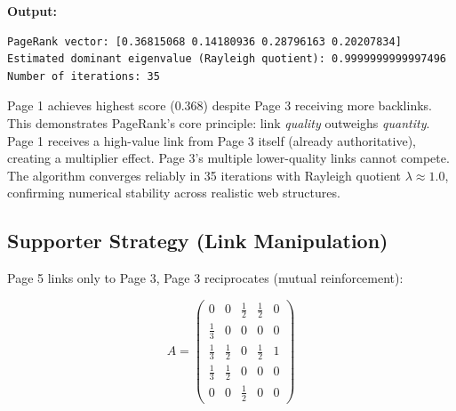 \documentclass[11pt]{article}
\begin{document}
\noindent\textbf{Output:}
\begin{lstlisting}
PageRank vector: [0.36815068 0.14180936 0.28796163 0.20207834]
Estimated dominant eigenvalue (Rayleigh quotient): 0.9999999999997496
Number of iterations: 35
\end{lstlisting}
\noindent



\noindent Page 1 achieves highest score (0.368) despite Page 3 receiving more backlinks. This demonstrates PageRank's core principle: link \emph{quality} outweighs \emph{quantity}. Page 1 receives a high-value link from Page 3 itself (already authoritative), creating a multiplier effect. Page 3's multiple lower-quality links cannot compete. The algorithm converges reliably in 35 iterations with Rayleigh quotient $\lambda \approx 1.0$, confirming numerical stability across realistic web structures.

\subsection{Supporter Strategy (Link Manipulation)}

Page 5 links only to Page 3, Page 3 reciprocates (mutual reinforcement):



\begin{figure}[h!]
\centering
\begin{minipage}{0.45\textwidth}
\centering
{}
\end{minipage}
\hfill
\begin{minipage}{0.45\textwidth}
\centering
\[
A =
\begin{pmatrix}
0 & 0 & \tfrac12 & \tfrac12 & 0 \\
\tfrac13 & 0 & 0 & 0 & 0 \\
\tfrac13 & \tfrac12 & 0 & \tfrac12 & 1\\
\tfrac13 & \tfrac12 & 0 & 0 & 0 \\
0 & 0 & \tfrac12 & 0 & 0 
\end{pmatrix}
\]
\end{minipage}

\end{figure}
\end{document}
